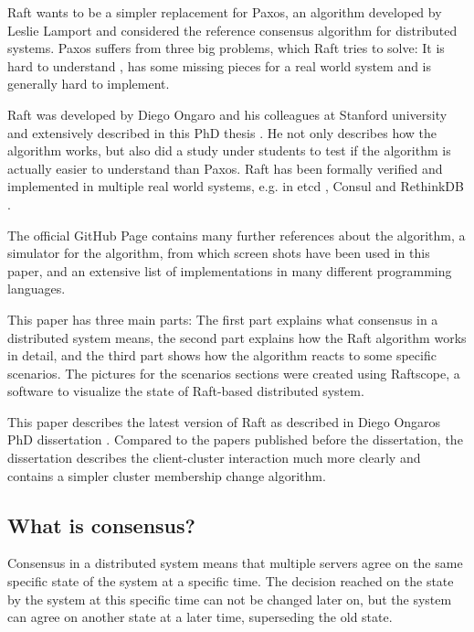 Raft wants to be a simpler replacement for Paxos, an algorithm developed by Leslie Lamport and considered the reference consensus algorithm for distributed systems\cite{paxos}. Paxos suffers from three big problems, which Raft tries to solve: It is hard to understand \cite[p.91]{raft_phd_thesis}, has some missing pieces for a real world system and is generally hard to implement\cite{paxos_made_live}.

Raft was developed by Diego Ongaro and his colleagues at Stanford university and extensively described in this PhD thesis \cite{raft_phd_thesis}. He not only describes how the algorithm works, but also did a study under students to test if the algorithm is actually easier to understand than Paxos. Raft has been formally verified \cite{raft_proof} and implemented in multiple real world systems, e.g. in etcd \cite{etcd_raft}, Consul \cite{consul_raft} and RethinkDB \cite{rethinkdb_raft}.

The official GitHub Page \cite{raft_github} contains many further references about the algorithm, a simulator for the algorithm, from which screen shots have been used in this paper, and an extensive list of implementations in many different programming languages.

This paper has three main parts: The first part explains what consensus in a distributed system means, the second part explains how the Raft algorithm works in detail, and the third part shows how the algorithm reacts to some specific scenarios.
The pictures for the scenarios sections were created using Raftscope\cite{raftscope}, a software to visualize the state of Raft-based distributed system.

This paper describes the latest version of Raft as described in Diego Ongaros PhD dissertation \cite{raft_phd_thesis}. Compared to the papers published before the dissertation, the dissertation describes the client-cluster interaction much more clearly and contains a simpler cluster membership change algorithm.

\subsection{What is consensus?}

Consensus in a distributed system means that multiple servers agree on the same specific state of the system at a specific time. The decision reached on the state by the system at this specific time can not be changed later on, but the system can agree on another state at a later time, superseding the old state.

